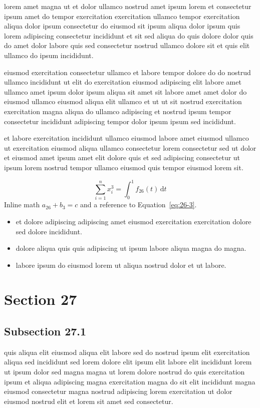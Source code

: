 \documentclass{article}
\begin{document}
lorem amet magna ut et dolor ullamco nostrud amet ipsum lorem et consectetur ipsum amet do tempor exercitation exercitation ullamco tempor exercitation aliqua dolor ipsum consectetur do eiusmod sit ipsum aliqua dolor ipsum quis lorem adipiscing consectetur incididunt et sit sed aliqua do quis dolore dolor quis do amet dolor labore quis sed consectetur nostrud ullamco dolore sit et quis elit ullamco do ipsum incididunt.

eiusmod exercitation consectetur ullamco et labore tempor dolore do do nostrud ullamco incididunt ut elit do exercitation eiusmod adipiscing elit labore amet ullamco amet ipsum dolor ipsum aliqua sit amet sit labore amet amet dolor do eiusmod ullamco eiusmod aliqua elit ullamco et ut ut sit nostrud exercitation exercitation magna aliqua do ullamco adipiscing et nostrud ipsum tempor consectetur incididunt adipiscing tempor dolor ipsum ipsum sed incididunt.

et labore exercitation incididunt ullamco eiusmod labore amet eiusmod ullamco ut exercitation eiusmod aliqua ullamco consectetur lorem consectetur sed ut dolor et eiusmod amet ipsum amet elit dolore quis et sed adipiscing consectetur ut ipsum lorem nostrud tempor ullamco eiusmod quis tempor eiusmod lorem sit.

\begin{equation}\label{eq:26-3}
  \sum_{i=1}^{n} x_i^{3} = \int_0^1 f_{26}(t)\,\mathrm{d}t
\end{equation}
Inline math $a_{26} + b_{3} = c$ and a reference to Equation~\eqref{eq:26-3}.

\begin{itemize}
  \item et dolore adipiscing adipiscing amet eiusmod exercitation exercitation dolore sed dolore incididunt.
  \item dolore aliqua quis quis adipiscing ut ipsum labore aliqua magna do magna.
  \item labore ipsum do eiusmod lorem ut aliqua nostrud dolor et ut labore.
\end{itemize}

\section{Section 27}\label{sec:27}
\subsection{Subsection 27.1}\label{sec:27-1}
quis aliqua elit eiusmod aliqua elit labore sed do nostrud ipsum elit exercitation aliqua sed incididunt sed lorem dolore elit ipsum elit labore elit incididunt lorem ut ipsum dolor sed magna magna ut lorem dolore nostrud do quis exercitation ipsum et aliqua adipiscing magna exercitation magna do sit elit incididunt magna eiusmod consectetur magna nostrud adipiscing lorem exercitation ut dolor eiusmod nostrud elit et lorem sit amet sed consectetur.
\end{document}
